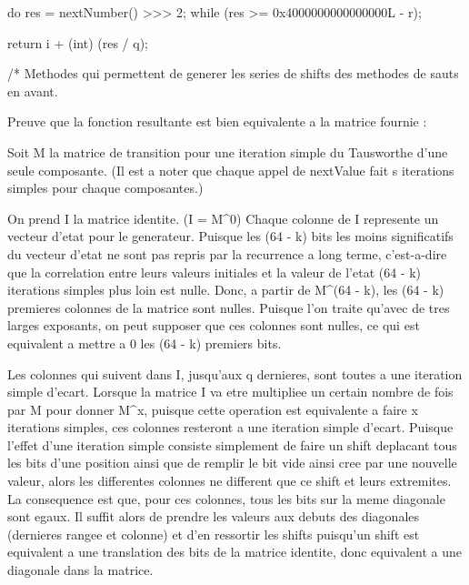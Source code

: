 \begin{code}
\begin{hide}
{      do {
         res = nextNumber() >>> 2;
      } while (res >= 0x4000000000000000L - r);

      return i + (int) (res / q);
   }


    /*
     Methodes qui permettent de generer les series de shifts des
     methodes de sauts en avant.


     Preuve que la fonction resultante est bien equivalente a la matrice
     fournie :

     Soit M la matrice de transition pour une iteration simple du Tausworthe
     d'une seule composante. (Il est a noter que chaque appel de
     nextValue fait s iterations simples pour chaque composantes.)

     On prend I la matrice identite. (I = M^0)
     Chaque colonne de I represente un vecteur d'etat pour le generateur.
     Puisque les (64 - k) bits les moins significatifs du vecteur d'etat
     ne sont pas repris par la recurrence a long terme, c'est-a-dire que
     la correlation entre leurs valeurs initiales et la valeur de l'etat
     (64 - k) iterations simples plus loin est nulle. Donc, a partir de
     M^(64 - k), les (64 - k) premieres colonnes de la matrice sont nulles.
     Puisque l'on traite qu'avec de tres larges exposants, on peut
     supposer que ces colonnes sont nulles, ce qui est equivalent a
     mettre a 0 les (64 - k) premiers bits.

     Les colonnes qui suivent dans I, jusqu'aux q dernieres, sont toutes
     a une iteration simple d'ecart. Lorsque la matrice I va etre multipliee
     un certain nombre de fois par M pour donner M^x, puisque cette operation
     est equivalente a faire x iterations simples, ces colonnes resteront
     a une iteration simple d'ecart. Puisque l'effet d'une iteration simple
     consiste simplement de faire un shift deplacant tous les bits d'une
     position ainsi que de remplir le bit vide ainsi cree par une nouvelle
     valeur, alors les differentes colonnes ne different que ce shift et
     leurs extremites. La consequence est que, pour ces colonnes, tous les
     bits sur la meme diagonale sont egaux. Il suffit alors de prendre les
     valeurs aux debuts des diagonales (dernieres rangee et colonne) et
     d'en ressortir les shifts puisqu'un shift est equivalent a une
     translation des bits de la matrice identite, donc equivalent a une
     diagonale dans la matrice.


\end{hide}
\end{code}
